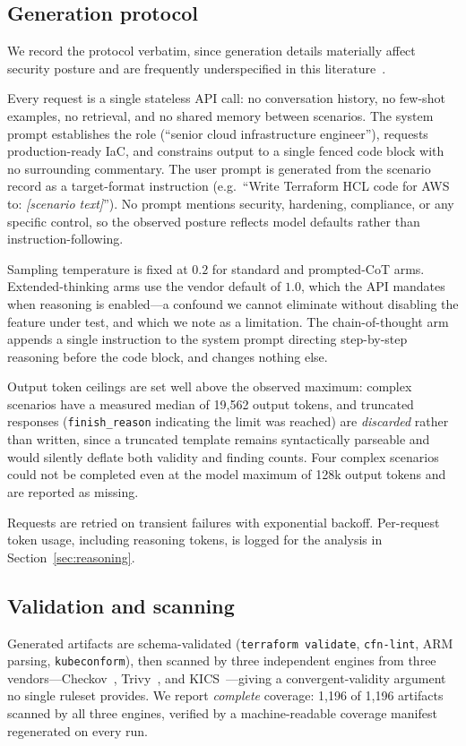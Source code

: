 \documentclass[conference]{IEEEtran}
\begin{document}
\subsection{Generation protocol}
\label{sec:protocol}
We record the protocol verbatim, since generation details materially affect
security posture and are frequently underspecified in this
literature~\cite{ralph2021empirical}.

Every request is a single stateless API call: no conversation history, no
few-shot examples, no retrieval, and no shared memory between scenarios. The
system prompt establishes the role (``senior cloud infrastructure engineer''),
requests production-ready IaC, and constrains output to a single fenced code
block with no surrounding commentary. The user prompt is generated from the
scenario record as a target-format instruction (e.g.\ ``Write Terraform HCL code
for AWS to: \emph{[scenario text]}''). No prompt mentions security, hardening,
compliance, or any specific control, so the observed posture reflects model
defaults rather than instruction-following.

Sampling temperature is fixed at $0.2$ for standard and prompted-CoT arms.
Extended-thinking arms use the vendor default of $1.0$, which the API mandates
when reasoning is enabled---a confound we cannot eliminate without disabling the
feature under test, and which we note as a limitation. The chain-of-thought arm
appends a single instruction to the system prompt directing step-by-step
reasoning before the code block, and changes nothing else.

Output token ceilings are set well above the observed maximum: complex scenarios
have a measured median of 19{,}562 output tokens, and truncated responses
(\texttt{finish\_reason} indicating the limit was reached) are \emph{discarded}
rather than written, since a truncated template remains syntactically parseable
and would silently deflate both validity and finding counts. Four complex
scenarios could not be completed even at the model maximum of 128k output tokens
and are reported as missing.

Requests are retried on transient failures with exponential backoff. Per-request
token usage, including reasoning tokens, is logged for the analysis in
Section~\ref{sec:reasoning}.

\subsection{Validation and scanning}
Generated artifacts are schema-validated (\texttt{terraform validate},
\texttt{cfn-lint}, ARM parsing, \texttt{kubeconform}), then scanned by three
independent engines from three vendors---Checkov~\cite{checkov},
Trivy~\cite{trivy}, and KICS~\cite{kics}---giving a convergent-validity argument
no single ruleset provides. We report \emph{complete} coverage: 1{,}196 of
1{,}196 artifacts scanned by all three engines, verified by a machine-readable
coverage manifest regenerated on every run.
\end{document}
